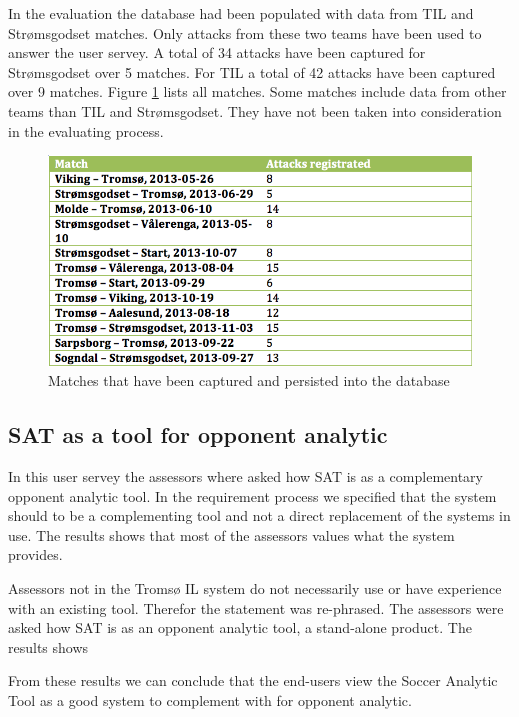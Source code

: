 In the evaluation the database had been populated with data from \ac{TIL} and Str{\o}msgodset matches. Only attacks from these two teams have been used to answer the user servey. A total of 34 attacks have been captured for Str{\o}msgodset over 5 matches. For \ac{TIL} a total of 42 attacks have been captured over 9 matches. Figure \ref{fig:matches_regged} lists all matches. Some matches include data from other teams than \ac{TIL} and Str{\o}msgodset. They have not been taken into consideration in the evaluating process.

\begin{figure}[ht!]
\centering
\includegraphics[width=1\textwidth]{images/evaluation/matched_regged.png}
\caption{Matches that have been captured and persisted into the database}
\label{fig:matches_regged}
\end{figure}

\subsection{SAT as a tool for opponent analytic}

In this user servey the assessors where asked how SAT is as a complementary opponent analytic tool. In the requirement process we specified that the system should to be a complementing tool and not a direct replacement of the systems in use. The results shows that most of the assessors values what the system provides. 

Assessors not in the Tromsø IL system do not necessarily use or have experience with an existing tool. Therefor the statement was re-phrased. The assessors were asked how SAT is as an opponent analytic tool, a stand-alone product. The results shows

From these results we can conclude that the end-users view the Soccer Analytic Tool as a good system to complement with for opponent analytic.

